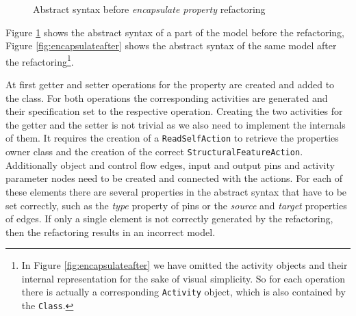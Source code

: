 \documentclass{llncs}
\begin{document}
\begin{figure}
 \caption{Abstract syntax before \textit{encapsulate property} refactoring}
 \label{fig:encapsulatebefore}
\end{figure}

Figure \ref{fig:encapsulatebefore} shows the abstract syntax of a part of the model before the refactoring, 
Figure \ref{fig:encapsulateafter} shows the abstract syntax of the same model after the refactoring\footnote{
In Figure \ref{fig:encapsulateafter} 
we have omitted the activity objects and their internal representation for the sake of visual simplicity. So for each operation 
there is actually a corresponding \texttt{Activity} object, which is also contained by the \texttt{Class}.}.

At first 
getter and setter operations for the property are created and
added to the class. For both operations the corresponding activities are generated and their specification set to the 
respective operation. 
Creating the two activities for the getter and the setter is not trivial as we also need to implement the internals of them. It requires the creation of
a \texttt{Read\-Self\-Action} to retrieve the properties owner class and the creation of the correct \texttt{Structural\-Feature\-Action}.
Additionally object and control flow edges, input and output pins and activity parameter nodes need to be created and connected with the 
actions. For each of these elements there are several properties in the abstract syntax that have to be set correctly, such as the 
\textit{type} property of pins or the \textit{source} and \textit{target} properties of edges. If only a single element is not correctly 
generated by the refactoring, then the refactoring results in an incorrect model.
\end{document}
